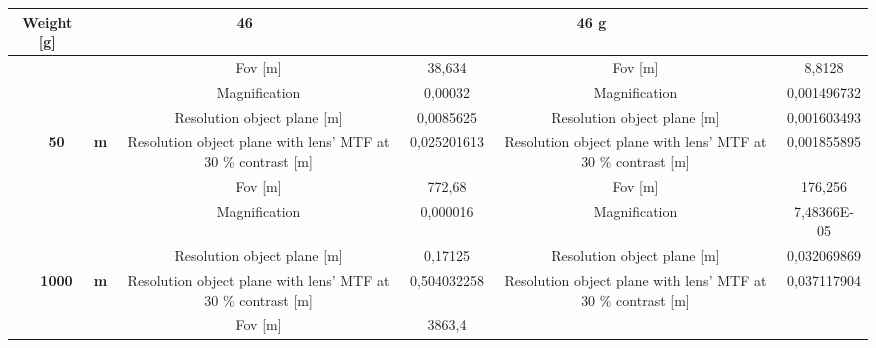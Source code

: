 \begin{table}[H]
{\begin{tabular}{ccc|cc|cc|}
  \multicolumn{2}{c|}{\textbf{Weight {[}g{]}}} &
  \multicolumn{2}{c|}{46} &
  \multicolumn{2}{c|}{46 g} \\ \hline
\multicolumn{1}{|c|}{} &
  \cellcolor[HTML]{EFEFEF} &
  \cellcolor[HTML]{EFEFEF} &
  \cellcolor[HTML]{EFEFEF}Fov {[}m{]} &
  \cellcolor[HTML]{EFEFEF}38,634 &
  \cellcolor[HTML]{EFEFEF}Fov {[}m{]} &
  \cellcolor[HTML]{EFEFEF}8,8128 \\
\multicolumn{1}{|c|}{} &
  \cellcolor[HTML]{EFEFEF} &
  \cellcolor[HTML]{EFEFEF} &
  Magnification &
  0,00032 &
  Magnification &
  0,001496732 \\
\multicolumn{1}{|c|}{} &
  \cellcolor[HTML]{EFEFEF} &
  \cellcolor[HTML]{EFEFEF} &
  \cellcolor[HTML]{EFEFEF}Resolution object plane {[}m{]} &
  \cellcolor[HTML]{EFEFEF}0,0085625 &
  \cellcolor[HTML]{EFEFEF}Resolution object plane {[}m{]} &
  \cellcolor[HTML]{EFEFEF}0,001603493 \\
\multicolumn{1}{|c|}{} &
  \multirow{-4}{*}{\cellcolor[HTML]{EFEFEF}\textbf{50}} &
  \multirow{-4}{*}{\cellcolor[HTML]{EFEFEF}\textbf{m}} &
  Resolution object plane with lens' MTF at 30 \% contrast {[}m{]} &
  0,025201613 &
  Resolution object plane with lens' MTF at 30 \% contrast {[}m{]} &
  0,001855895 \\ \cline{2-7} 
\multicolumn{1}{|c|}{} &
  \cellcolor[HTML]{EFEFEF} &
  \cellcolor[HTML]{EFEFEF} &
  \cellcolor[HTML]{EFEFEF}Fov {[}m{]} &
  \cellcolor[HTML]{EFEFEF}772,68 &
  \cellcolor[HTML]{EFEFEF}Fov {[}m{]} &
  \cellcolor[HTML]{EFEFEF}176,256 \\
\multicolumn{1}{|c|}{} &
  \cellcolor[HTML]{EFEFEF} &
  \cellcolor[HTML]{EFEFEF} &
  Magnification &
  0,000016 &
  Magnification &
  7,48366E-05 \\
\multicolumn{1}{|c|}{} &
  \cellcolor[HTML]{EFEFEF} &
  \cellcolor[HTML]{EFEFEF} &
  \cellcolor[HTML]{EFEFEF}Resolution object plane {[}m{]} &
  \cellcolor[HTML]{EFEFEF}0,17125 &
  \cellcolor[HTML]{EFEFEF}Resolution object plane {[}m{]} &
  \cellcolor[HTML]{EFEFEF}0,032069869 \\
\multicolumn{1}{|c|}{} &
  \multirow{-4}{*}{\cellcolor[HTML]{EFEFEF}\textbf{1000}} &
  \multirow{-4}{*}{\cellcolor[HTML]{EFEFEF}\textbf{m}} &
  Resolution object plane with lens' MTF at 30 \% contrast {[}m{]} &
  0,504032258 &
  Resolution object plane with lens' MTF at 30 \% contrast {[}m{]} &
  0,037117904 \\ \cline{2-7} 
\multicolumn{1}{|c|}{} &
  \cellcolor[HTML]{EFEFEF} &
  \cellcolor[HTML]{EFEFEF} &
  \cellcolor[HTML]{EFEFEF}Fov {[}m{]} &
  \cellcolor[HTML]{EFEFEF}3863,4 &

\end{tabular}}
\end{table}
